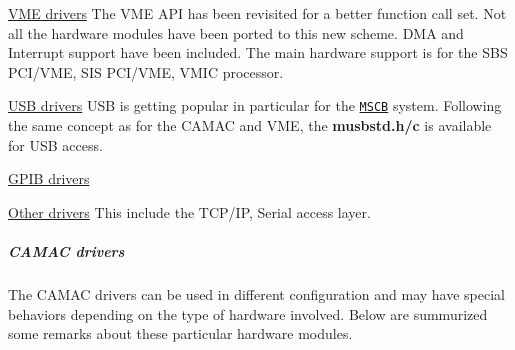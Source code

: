 \begin{DoxyItemize}
\item \hyperlink{FE_Hardware_VME_drivers}{VME drivers} The VME API has been revisited for a better function call set. Not all the hardware modules have been ported to this new scheme. DMA and Interrupt support have been included. The main hardware support is for the SBS PCI/VME, SIS PCI/VME, VMIC processor.
\end{DoxyItemize}


\begin{DoxyItemize}
\item \hyperlink{FE_Hardware_USB_drivers}{USB drivers} USB is getting popular in particular for the \href{http://midas.psi.ch/mscb/}{\tt MSCB} system. Following the same concept as for the CAMAC and VME, the {\bfseries musbstd.h/c} is available for USB access.
\end{DoxyItemize}


\begin{DoxyItemize}
\item \hyperlink{FE_Hardware_GPIB_drivers}{GPIB drivers}
\end{DoxyItemize}


\begin{DoxyItemize}
\item \hyperlink{FE_Hardware_Other_drivers}{Other drivers} This include the TCP/IP, Serial access layer.
\end{DoxyItemize}

\label{FE_Hardware_idx_Hardware_drivers_CAMAC}
\hypertarget{FE_Hardware_idx_Hardware_drivers_CAMAC}{}
 

 \hypertarget{FE_Hardware_CAMAC_drivers}{}\subparagraph{CAMAC drivers}\label{FE_Hardware_CAMAC_drivers}
The CAMAC drivers can be used in different configuration and may have special behaviors depending on the type of hardware involved. Below are summurized some remarks about these particular hardware modules.


